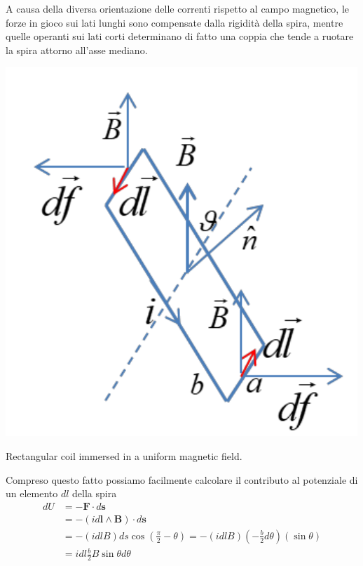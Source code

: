 A causa della diversa orientazione delle correnti rispetto al campo magnetico, le forze in gioco sui lati lunghi sono compensate dalla rigidità della spira, mentre quelle operanti sui lati corti determinano di fatto una coppia che tende a ruotare la spira attorno all’asse mediano.
\begin{marginfigure}
	\includegraphics{figs/rectangular-coil}
	\caption{Rectangular coil immersed in a uniform magnetic field.}
	\label{fig:rectangular-coil}
\end{marginfigure}
Compreso questo fatto possiamo facilmente calcolare il contributo al potenziale di un elemento $dl$ della spira
\begin{align*}
	d U &= - \bm{F} \cdot d \bm{s} \\
	&= - (id \bm{l} \wedge \bm{B}) \cdot d \bm{s} \\
	& = - (i dl B) ds \cos\left( \frac{\pi}{2} - \theta \right) = -(idlB)\left( - \frac{b}{2} d \theta \right)(\sin \theta) \\
	&= i dl \frac{b}{2} B \sin \theta d \theta
\end{align*}
